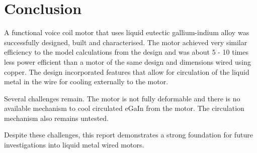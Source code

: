 \documentclass[a4paper,12pt]{article}
\begin{document}
\newpage

\section{Conclusion}
A functional voice coil motor that uses liquid eutectic gallium-indium alloy was successfully designed, built and characterised. The motor achieved very similar efficiency to the model calculations from the design and was about 5 - 10 times less power efficient than a motor of the same design and dimensions wired using copper. The design incorporated features that allow for circulation of the liquid metal in the wire for cooling externally to the motor.

Several challenges remain. The motor is not fully deformable and there is no available mechanism to cool circulated eGaIn from the motor. The circulation mechanism also remains untested.

Despite these challenges, this report demonstrates a strong foundation for future investigations into liquid metal wired motors.

\newpage

\printbibliography
\end{document}
